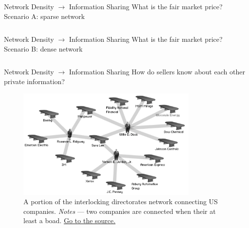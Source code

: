 \documentclass[notes, aspectratio=1610]{beamer}
\begin{document}
\begin{frame}
	{Network Density $\rightarrow$ Information Sharing}
	{What is the fair market price? Scenario A: sparse network}
	\centering
	\begin{columns}
		\begin{column}{0.5\textwidth}
			
		\end{column}
		\begin{column}{0.45\textwidth}
			
		\end{column}
	\end{columns}
\end{frame}

\begin{frame}
	{Network Density $\rightarrow$ Information Sharing}
	{What is the fair market price? Scenario B: dense network}
	\centering
	\begin{columns}
		\begin{column}{0.5\textwidth}
			
		\end{column}
		\begin{column}{0.45\textwidth}
			
		\end{column}
	\end{columns}
\end{frame}

\begin{frame}
	{Network Density $\rightarrow$ Information Sharing}
	{How do sellers know about each other private information?}
	\begin{figure}
			\includegraphics[width=0.8\textwidth]{images/interlock}
			\caption*{A portion of the interlocking directorates
			network connecting US companies.
			\textit{Notes} --- two companies are connected when their at 
			least a boad. \href{https://sites.google.com/site/occupypoliticsintheusa/interlocking-directorates-the-foundation-of-american-corporatocracy}
			{Go to the source.}}
	\end{figure}
\end{frame}
\end{document}
